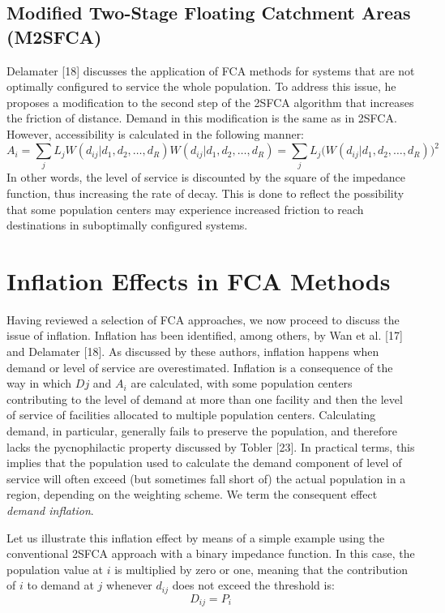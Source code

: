\documentclass[10pt,letterpaper]{article}
\begin{document}
\subsection{Modified Two-Stage Floating Catchment Areas
(M2SFCA)}\label{modified-two-stage-floating-catchment-areas-m2sfca}

Delamater {[}18{]} discusses the application of FCA methods for systems
that are not optimally configured to service the whole population. To
address this issue, he proposes a modification to the second step of the
2SFCA algorithm that increases the friction of distance. Demand in this
modification is the same as in 2SFCA. However, accessibility is
calculated in the following manner: \[
A_i = \sum_j{L_jW(d_{ij}|d_1, d_2, \dots, d_R)W(d_{ij}|d_1, d_2, \dots, d_R)}=\sum_j{L_j\big(W(d_{ij}|d_1, d_2, \dots, d_R)\big)^2}
\] In other words, the level of service is discounted by the square of
the impedance function, thus increasing the rate of decay. This is done
to reflect the possibility that some population centers may experience
increased friction to reach destinations in suboptimally configured
systems.

\section{Inflation Effects in FCA
Methods}\label{inflation-effects-in-fca-methods}

Having reviewed a selection of FCA approaches, we now proceed to discuss
the issue of inflation. Inflation has been identified, among others, by
Wan et al. {[}17{]} and Delamater {[}18{]}. As discussed by these
authors, inflation happens when demand or level of service are
overestimated. Inflation is a consequence of the way in which \(Dj\) and
\(A_i\) are calculated, with some population centers contributing to the
level of demand at more than one facility and then the level of service
of facilities allocated to multiple population centers. Calculating
demand, in particular, generally fails to preserve the population, and
therefore lacks the pycnophilactic property discussed by Tobler
{[}23{]}. In practical terms, this implies that the population used to
calculate the demand component of level of service will often exceed
(but sometimes fall short of) the actual population in a region,
depending on the weighting scheme. We term the consequent effect
\emph{demand inflation}.

Let us illustrate this inflation effect by means of a simple example
using the conventional 2SFCA approach with a binary impedance function.
In this case, the population value at \(i\) is multiplied by zero or
one, meaning that the contribution of \(i\) to demand at \(j\) whenever
\(d_{ij}\) does not exceed the threshold is: \[
D_{ij} = P_i
\]
\end{document}
